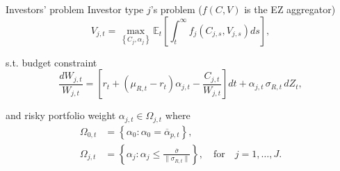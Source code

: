 \begin{frame}{Investors' problem}
Investor type $j$'s problem {\footnotesize ($ f(C,V) $ is the EZ aggregator)}
    \[V_{j, t}=\max _{\left\lbrace C_{j}, \alpha_{j}\right\rbrace} \mathbb{E}_{t}\left[\int_{t}^{\infty} f_{j}\left(C_{j, s}, V_{j, s}\right) d s\right],\]

\medskip
s.t. budget constraint
    \[\frac{d W_{j, t}}{W_{j, t}}=\left[r_{t} +\left(\mu_{R, t}-r_{t}\right) \alpha_{j, t}-\frac{C_{j, t}}{W_{j, t}}\right] dt+\alpha_{j, t}\, \sigma_{R, t}\, d Z_{t},\]

\medskip
and risky portfolio weight $\alpha_{j,t}\in\Omega_{j,t}$ where 
\begin{align*}
    \Omega_{0, t}&=\left\{\alpha_{0}: \alpha_{0}=\overline{\alpha}_{p, t}\right\},\\
    \Omega_{j, t}&=\left\{\alpha_{j}: \alpha_{j} \leq \frac{\overline{\sigma}}{\| \sigma_{R, t }\|}\right\},\quad\text{for}\quad j=1, \ldots, J.
\end{align*}

\end{frame}


